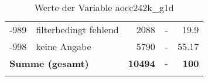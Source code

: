 \begin{longtable}{Xlrrr}
       -989 & filterbedingt fehlend & \num{2088} & - & \num[round-mode=places,round-precision=2]{19.9} \\

       -998 & keine Angabe & \num{5790} & - & \num[round-mode=places,round-precision=2]{55.17} \\

     \midrule
     \multicolumn{2}{l}{\textbf{Summe (gesamt)}} & \textbf{\num{10494}} & \textbf{-} & \textbf{\num{100}} \\
     \bottomrule
     \caption{Werte der Variable aocc242k\_g1d}
     \end{longtable}
     

